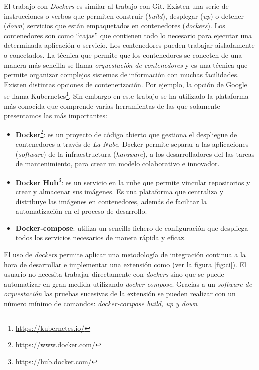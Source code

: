 El trabajo con \textit{Dockers} es similar al trabajo con Git. Existen una serie de instrucciones o verbos que permiten construir (\textit{build}), desplegar (\textit{up}) o detener (\textit{down}) servicios que están empaquetados en contenedores (\textit{dockers}). Los contenedores son como ``cajas'' que contienen todo lo necesario para ejecutar una determinada aplicación o servicio. Los contenedores pueden trabajar aisladamente o conectados. La técnica que permite que los contenedores se conecten de una manera más sencilla se llama \textit{orquestación de contenedores} y es una técnica que permite organizar complejos sistemas de información con muchas facilidades. Existen distintas opciones de contenerización. Por ejemplo, la opción de Google se llama Kubernetes\footnote{\href{https://kubernetes.io/}{https://kubernetes.io/}}. Sin embargo en este trabajo se ha utilizado la plataforma más conocida que comprende varias herramientas de las que solamente presentamos las más importantes:

\begin{itemize}
\item\textbf{Docker}\footnote{\url{https://www.docker.com/}}: es un proyecto de código abierto que gestiona el despliegue de contenedores a través de \textit{La Nube}. Docker permite separar a las aplicaciones (\textit{software}) de la infraestructura (\textit{hardware}), a los desarrolladores del las tareas de mantenimiento, para crear un modelo colaborativo e innovador.
\item\textbf{Docker Hub}\footnote{\url{https://hub.docker.com/}}: es un servicio en la nube que permite vincular repositorios y crear y almacenar sus imágenes. Es una plataforma que centraliza y distribuye las imágenes en contenedores, además de facilitar la automatización en el proceso de desarrollo.
\item\textbf{Docker-compose}: utiliza un sencillo fichero de configuración que despliega todos los servicios necesarios de manera rápida y eficaz.
\end{itemize}

El uso de \textit{dockers} permite aplicar una metodología de integración continua a la hora de desarrollar e implementar una extensión como \pgland{} (ver la figura \ref{fig:ci}). El usuario no necesita trabajar directamente con \textit{dockers} sino que se puede automatizar en gran medida utilizando \textit{docker-compose}. Gracias a un \textit{software de orquestación} las pruebas sucesivas de la extensión se pueden realizar con un número mínimo de comandos: \textit{docker-compose build, up y down}

